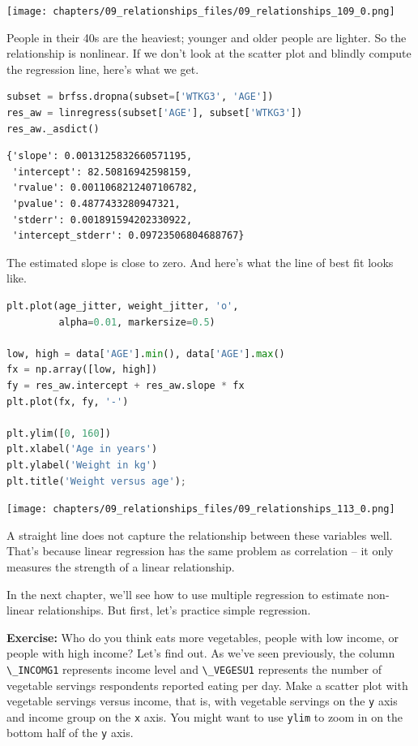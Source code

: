 \begin{center}
\texttt{[image: chapters/09\_relationships\_files/09\_relationships\_109\_0.png]}
\end{center}

People in their 40s are the heaviest; younger and older people are
lighter. So the relationship is nonlinear. If we don't look at the
scatter plot and blindly compute the regression line, here's what we
get.

\begin{lstlisting}[language=Python,style=source]
subset = brfss.dropna(subset=['WTKG3', 'AGE']) 
res_aw = linregress(subset['AGE'], subset['WTKG3'])
res_aw._asdict()
\end{lstlisting}

\begin{lstlisting}[style=output]
{'slope': 0.0013125832660571195,
 'intercept': 82.50816942598159,
 'rvalue': 0.0011068212407106782,
 'pvalue': 0.4877433280947321,
 'stderr': 0.001891594202330922,
 'intercept_stderr': 0.09723506804688767}
\end{lstlisting}

The estimated slope is close to zero. And here's what the line of best
fit looks like.

\begin{lstlisting}[language=Python,style=source]
plt.plot(age_jitter, weight_jitter, 'o', 
         alpha=0.01, markersize=0.5)

low, high = data['AGE'].min(), data['AGE'].max()
fx = np.array([low, high])
fy = res_aw.intercept + res_aw.slope * fx
plt.plot(fx, fy, '-')

plt.ylim([0, 160])
plt.xlabel('Age in years')
plt.ylabel('Weight in kg')
plt.title('Weight versus age');
\end{lstlisting}

\begin{center}
\texttt{[image: chapters/09\_relationships\_files/09\_relationships\_113\_0.png]}
\end{center}

A straight line does not capture the relationship between these
variables well. That's because linear regression has the same problem as
correlation -- it only measures the strength of a linear relationship.

In the next chapter, we'll see how to use multiple regression to
estimate non-linear relationships. But first, let's practice simple
regression.

\textbf{Exercise:} Who do you think eats more vegetables, people with
low income, or people with high income? Let's find out. As we've seen
previously, the column \passthrough{\lstinline!\_INCOMG1!} represents
income level and \passthrough{\lstinline!\_VEGESU1!} represents the
number of vegetable servings respondents reported eating per day. Make a
scatter plot with vegetable servings versus income, that is, with
vegetable servings on the \passthrough{\lstinline!y!} axis and income
group on the \passthrough{\lstinline!x!} axis. You might want to use
\passthrough{\lstinline!ylim!} to zoom in on the bottom half of the
\passthrough{\lstinline!y!} axis.

